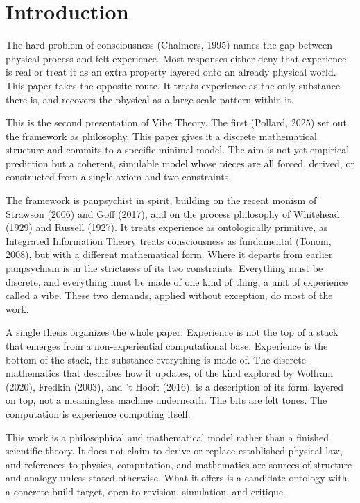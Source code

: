 \section{Introduction}

The hard problem of consciousness (Chalmers, 1995) names the gap between physical process and felt experience. Most responses either deny that experience is real or treat it as an extra property layered onto an already physical world. This paper takes the opposite route. It treats experience as the only substance there is, and recovers the physical as a large-scale pattern within it.

This is the second presentation of Vibe Theory. The first (Pollard, 2025) set out the framework as philosophy. This paper gives it a discrete mathematical structure and commits to a specific minimal model. The aim is not yet empirical prediction but a coherent, simulable model whose pieces are all forced, derived, or constructed from a single axiom and two constraints.

The framework is panpsychist in spirit, building on the recent monism of Strawson (2006) and Goff (2017), and on the process philosophy of Whitehead (1929) and Russell (1927). It treats experience as ontologically primitive, as Integrated Information Theory treats consciousness as fundamental (Tononi, 2008), but with a different mathematical form. Where it departs from earlier panpsychism is in the strictness of its two constraints. Everything must be discrete, and everything must be made of one kind of thing, a unit of experience called a vibe. These two demands, applied without exception, do most of the work.

A single thesis organizes the whole paper. Experience is not the top of a stack that emerges from a non-experiential computational base. Experience is the bottom of the stack, the substance everything is made of. The discrete mathematics that describes how it updates, of the kind explored by Wolfram (2020), Fredkin (2003), and 't Hooft (2016), is a description of its form, layered on top, not a meaningless machine underneath. The bits are felt tones. The computation is experience computing itself.

This work is a philosophical and mathematical model rather than a finished scientific theory. It does not claim to derive or replace established physical law, and references to physics, computation, and mathematics are sources of structure and analogy unless stated otherwise. What it offers is a candidate ontology with a concrete build target, open to revision, simulation, and critique.
